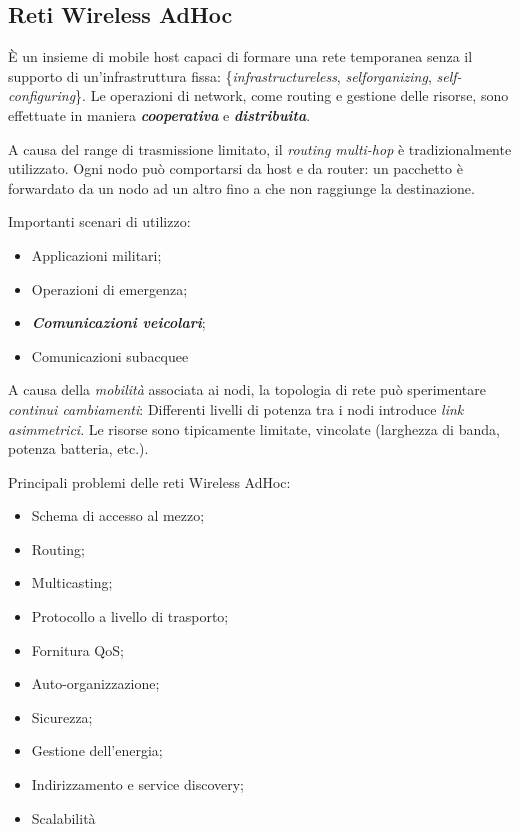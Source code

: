 \subsection{Reti Wireless AdHoc}

\`E un insieme di mobile host capaci di formare una rete temporanea senza il supporto di un'infrastruttura fissa: \{\textit{infrastructureless}, \textit{selforganizing}, \textit{self-configuring}\}.
Le operazioni di network, come routing e gestione delle risorse, sono effettuate in maniera \textit{\textbf{cooperativa}} e \textit{\textbf{distribuita}}.

A causa del range di trasmissione limitato, il \textit{routing multi-hop} è tradizionalmente utilizzato. Ogni nodo può comportarsi da host e da router: un pacchetto è forwardato da un nodo ad un altro fino a che non raggiunge la destinazione.

Importanti scenari di utilizzo:

\begin{itemize}

\item Applicazioni militari;
\item Operazioni di emergenza;
\item \textit{\textbf{Comunicazioni veicolari}};
\item Comunicazioni subacquee

\end{itemize}

A causa della \textit{mobilità} associata ai nodi, la topologia di rete può sperimentare \textit{continui cambiamenti}: Differenti livelli di potenza tra i nodi introduce \textit{link asimmetrici}. Le risorse sono tipicamente limitate, vincolate (larghezza di banda, potenza batteria, etc.).

Principali problemi delle reti Wireless AdHoc:

\begin{itemize}

\item Schema di accesso al mezzo;
\item Routing;
\item Multicasting;
\item Protocollo a livello di trasporto;
\item Fornitura QoS;
\item Auto-organizzazione;
\item Sicurezza;
\item Gestione dell'energia;
\item Indirizzamento e service discovery;
\item Scalabilità

\end{itemize}

